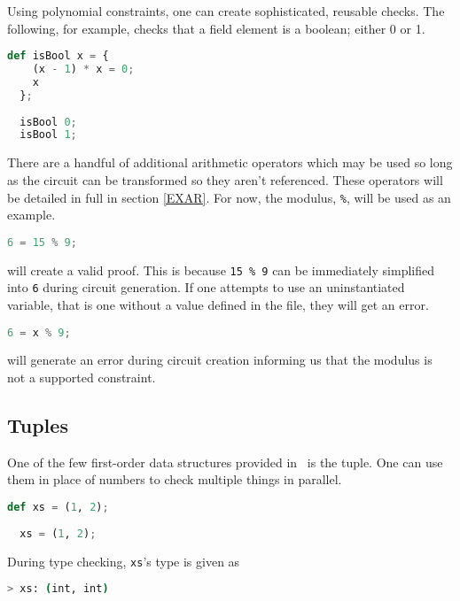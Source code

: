 Using polynomial constraints, one can create sophisticated, reusable checks. The following, for example, checks that a field element is a boolean; either 0 or 1.

\begin{lstlisting}[language=Python]
  def isBool x = { 
    (x - 1) * x = 0;
    x
  };
  
  isBool 0;
  isBool 1;
\end{lstlisting}

\label{ARITHEX}
There are a handful of additional arithmetic operators which may be used so long as the circuit can be transformed so they aren't referenced. These operators will be detailed in full in section \ref{EXAR}. For now, the modulus, \lstinline|%|, will be used as an example.

\begin{lstlisting}[language=Python]
  6 = 15 % 9;
\end{lstlisting}

will create a valid proof. This is because \lstinline|15 % 9| can be immediately simplified into \lstinline|6| during circuit generation. If one attempts to use an uninstantiated variable, that is one without a value defined in the file, they will get an error.

\begin{lstlisting}[language=Python]
  6 = x % 9;
\end{lstlisting}

will generate an error during circuit creation informing us that the modulus is not a supported constraint.


\subsection{Tuples} \label{TUP}

One of the few first-order data structures provided in \vampir\ is the tuple. One can use them in place of numbers to check multiple things in parallel.

\begin{lstlisting}[language=Python]
  def xs = (1, 2);
  
  xs = (1, 2);
\end{lstlisting}

During type checking, \lstinline{xs}'s type is given as

\begin{lstlisting}[language=bash]
  > xs: (int, int)
\end{lstlisting}

